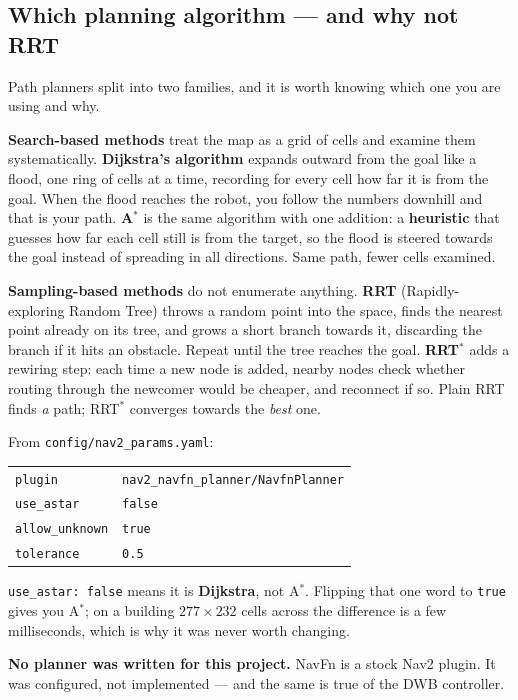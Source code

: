 \documentclass[11pt,a4paper]{report}
\newcommand{\term}[1]{\textcolor{rust}{\textbf{#1}}}
\newcommand{\file}[1]{\texttt{\small #1}}
\begin{document}
\subsection{Which planning algorithm --- and why not RRT}
\label{sec:which-planner}

Path planners split into two families, and it is worth knowing which one you
are using and why.

\textbf{Search-based methods} treat the map as a grid of cells and examine
them systematically. \term{Dijkstra's algorithm} expands outward from the
goal like a flood, one ring of cells at a time, recording for every cell how
far it is from the goal. When the flood reaches the robot, you follow the
numbers downhill and that is your path. \term{A$^{\ast}$} is the same
algorithm with one addition: a \term{heuristic} that guesses how far each
cell still is from the target, so the flood is steered towards the goal
instead of spreading in all directions. Same path, fewer cells examined.

\textbf{Sampling-based methods} do not enumerate anything. \term{RRT}
(Rapidly-exploring Random Tree) throws a random point into the space, finds
the nearest point already on its tree, and grows a short branch towards it,
discarding the branch if it hits an obstacle. Repeat until the tree reaches
the goal. \term{RRT$^{\ast}$} adds a rewiring step: each time a new node is
added, nearby nodes check whether routing through the newcomer would be
cheaper, and reconnect if so. Plain RRT finds \emph{a} path; RRT$^{\ast}$
converges towards the \emph{best} one.

\begin{keyidea}
From \file{config/nav2\_params.yaml}:
\begin{center}\small
\begin{tabular}{@{}ll@{}}
\toprule
\file{plugin} & \file{nav2\_navfn\_planner/NavfnPlanner} \\
\file{use\_astar} & \file{false} \\
\file{allow\_unknown} & \file{true} \\
\file{tolerance} & \file{0.5} \\
\bottomrule
\end{tabular}
\end{center}
\file{use\_astar: false} means it is \textbf{Dijkstra}, not A$^{\ast}$.
Flipping that one word to \file{true} gives you A$^{\ast}$; on a building
$277 \times 232$ cells across the difference is a few milliseconds, which is
why it was never worth changing.

\textbf{No planner was written for this project.} NavFn is a stock Nav2
plugin. It was configured, not implemented --- and the same is true of the DWB
controller.
\end{keyidea}
\end{document}
